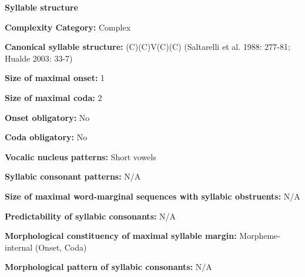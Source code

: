 \begin{styleBody}
\textbf{Syllable structure}
\end{styleBody}

\begin{styleBody}
\textbf{Complexity Category:} Complex
\end{styleBody}

\begin{styleBody}
\textbf{Canonical syllable structure:} (C)(C)V(C)(C)\textbf{ }(Saltarelli et al. 1988: 277-81; Hualde 2003: 33-7)
\end{styleBody}

\begin{styleBody}
\textbf{Size of maximal onset:} 1
\end{styleBody}

\begin{styleBody}
\textbf{Size of maximal coda:} 2
\end{styleBody}

\begin{styleBody}
\textbf{Onset obligatory:} No
\end{styleBody}

\begin{styleBody}
\textbf{Coda obligatory:} No
\end{styleBody}

\begin{styleBody}
\textbf{Vocalic nucleus patterns:} Short vowels
\end{styleBody}

\begin{styleBody}
\textbf{Syllabic consonant patterns:} N/A
\end{styleBody}

\begin{styleBody}
\textbf{Size of maximal word{}-marginal sequences with syllabic obstruents:} N/A
\end{styleBody}

\begin{styleBody}
\textbf{Predictability of syllabic consonants:} N/A
\end{styleBody}

\begin{styleBody}
\textbf{Morphological constituency of maximal syllable margin:} Morpheme-internal (Onset, Coda)
\end{styleBody}

\begin{styleBody}
\textbf{Morphological pattern of syllabic consonants:} N/A
\end{styleBody}

